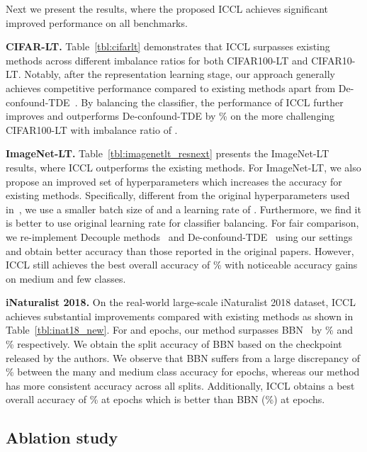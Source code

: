  Next we present the results,
where the proposed ICCL achieves significant improved performance on all benchmarks.

\textbf{CIFAR-LT.} 
Table~\ref{tbl:cifarlt} demonstrates that ICCL surpasses existing methods across different imbalance ratios for both CIFAR100-LT and CIFAR10-LT. 
Notably, after the representation learning stage, our approach generally achieves competitive performance compared to existing methods apart from De-confound-TDE~\cite{tang2020longtailed}.  
By balancing the classifier, the performance of ICCL further improves and outperforms De-confound-TDE by \% on the more challenging CIFAR100-LT with imbalance ratio of . 

\textbf{ImageNet-LT.} 
Table~\ref{tbl:imagenetlt_resnext} presents the ImageNet-LT results,
where ICCL outperforms the existing methods. 
For ImageNet-LT, we also propose an improved set of hyperparameters which increases the accuracy for existing methods.
Specifically, different from the original hyperparameters used in~\cite{decouple-longtail},
we use a smaller batch size of  and a learning rate of .
Furthermore, we find it is better to use original learning rate    for classifier balancing.
For fair comparison, we re-implement Decouple methods~\cite{decouple-longtail} and De-confound-TDE~\cite{tang2020longtailed} using 
our settings and obtain better accuracy than those reported in the original papers. 
However, ICCL still achieves the best overall accuracy of \% with noticeable 
accuracy gains on medium and few classes.

\textbf{iNaturalist 2018.} 
On the real-world large-scale iNaturalist 2018 dataset, ICCL achieves substantial improvements compared with existing methods as shown in Table~\ref{tbl:inat18_new}.
For  and  epochs, our method surpasses BBN~\cite{bbn} by \% and \% respectively.
We obtain the split accuracy of BBN based on the checkpoint released by the authors. 
We observe that BBN suffers from a large discrepancy of \% between the many and medium class accuracy for  epochs, 
whereas our method has more consistent accuracy across all splits.
Additionally, ICCL obtains a best overall accuracy of \% at  epochs which is better than BBN (\%) at  epochs. 


\subsection{Ablation study}

